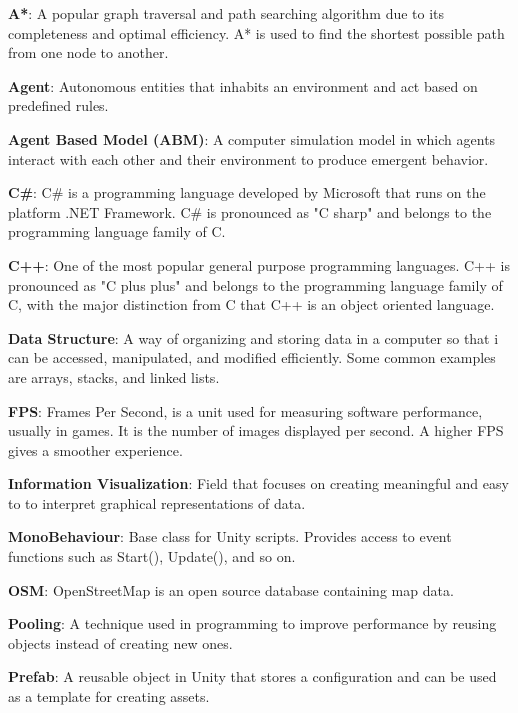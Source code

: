 \noindent
\label{itm:a*}\textbf{A*}: A popular graph traversal and path searching algorithm due to its completeness and optimal efficiency. A* is used to find the shortest possible path from one node to another.

\noindent
\label{itm:agent}\textbf{Agent}: Autonomous entities that inhabits an environment and act based on predefined rules.

\noindent
\label{itm:abm}\textbf{Agent Based Model (ABM)}: A computer simulation model in which agents interact with each other and their environment to produce emergent behavior. 

\noindent
\label{itm:csharp}\textbf{C\#}: C\# is a programming language developed by Microsoft that runs on the platform .NET Framework. C\# is pronounced as "C sharp" and belongs to the programming language family of C.

\noindent
\label{itm:c++}\textbf{C++}: One of the most popular general purpose programming languages. C++ is pronounced as "C plus plus" and belongs to the programming language family of C, with the major distinction from C that C++ is an object oriented language.

\noindent
\label{itm:data-structure}\textbf{Data Structure}: A way of organizing and storing data in a computer so that i can be accessed, manipulated, and modified efficiently. Some common examples are arrays, stacks, and linked lists. 

\noindent
\label{itm:fps}\textbf{FPS}: Frames Per Second, is a unit used for measuring software performance, usually in games. It is the number of images displayed per second. A higher FPS gives a smoother experience.

\noindent
\label{itm:information-visualization}\textbf{Information Visualization}: Field that focuses on creating meaningful and easy to to interpret graphical representations of data.

\noindent
\label{itm:monobehaviour}\textbf{MonoBehaviour}: Base class for Unity scripts. Provides access to event functions such as Start(), Update(), and so on.

\noindent
\label{itm:open-street-map}\textbf{OSM}: OpenStreetMap is an open source database containing map data.

\noindent
\label{itm:pooling}\textbf{Pooling}: A technique used in programming to improve performance by reusing objects instead of creating new ones. 

\noindent
\label{itm:prefab}\textbf{Prefab}: A reusable object in Unity that stores a configuration and can be used as a template for creating assets.

